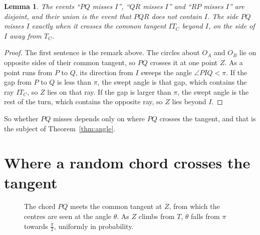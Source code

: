 \documentclass[11pt]{article}
\newtheorem{lemma}{Lemma}
\theoremstyle{remark}
\begin{document}
\begin{lemma}\label{lem:miss}
The events ``$PQ$ misses $I$'', ``$QR$ misses $I$'' and ``$RP$ misses $I$'' are disjoint, and
their union is the event that $PQR$ does not contain $I$. The side $PQ$ misses $I$ exactly when
it crosses the common tangent $IT_C$ beyond $I$, on the side of $I$ away from $T_C$.
\end{lemma}

\begin{proof}
The first sentence is the remark above. The circles about $O_A$ and $O_B$ lie on opposite sides
of their common tangent, so $PQ$ crosses it at one point $Z$. As a point runs from $P$ to $Q$, its
direction from $I$ sweeps the angle $\angle PIQ<\pi$. If the gap from $P$ to $Q$ is less than
$\pi$, the swept angle is that gap, which contains the ray $IT_C$, so $Z$ lies on that ray. If
the gap is larger than $\pi$, the swept angle is the rest of the turn, which contains the
opposite ray, so $Z$ lies beyond $I$.
\end{proof}

So whether $PQ$ misses depends only on where $PQ$ crosses the tangent, and that is the subject of
Theorem~\ref{thm:angle}.

\section{Where a random chord crosses the tangent}

\begin{figure}[ht]
\centering
{}
\caption{The chord $PQ$ meets the common tangent at $Z$, from which the centres are seen at the
angle $\theta$. As $Z$ climbs from $T$, $\theta$ falls from $\pi$ towards $\frac\pi2$, uniformly in
probability.}
\label{fig:chord}
\end{figure}
\end{document}
